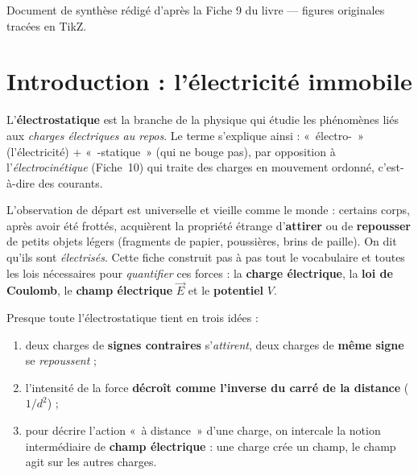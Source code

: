 \documentclass[11pt,a4paper]{article}
\newcommand{\vc}[1]{\vec{#1}}
\begin{document}
\vspace{0.5cm}
{\small\color{black!60} Document de synthèse rédigé d'après la Fiche 9 du livre — figures originales tracées en TikZ.}
\par
\endgroup

\newpage
\renewcommand{\contentsname}{\textcolor{primarydark}{Table des matières}}
\tableofcontents
\thispagestyle{fancy}
\newpage

\section{Introduction : l'électricité immobile}
L'\textbf{électrostatique} est la branche de la physique qui étudie les phénomènes liés aux
\emph{charges électriques au repos}. Le terme s'explique ainsi : «~électro-~» (l'électricité) +
«~-statique~» (qui ne bouge pas), par opposition à l'\emph{électrocinétique} (Fiche~10) qui traite
des charges en mouvement ordonné, c'est-à-dire des courants.

L'observation de départ est universelle et vieille comme le monde : certains corps, après avoir été
frottés, acquièrent la propriété étrange d'\textbf{attirer} ou de \textbf{repousser} de petits
objets légers (fragments de papier, poussières, brins de paille). On dit qu'ils sont
\emph{électrisés}. Cette fiche construit pas à pas tout le vocabulaire et toutes les lois nécessaires
pour \emph{quantifier} ces forces : la \textbf{charge électrique}, la \textbf{loi de Coulomb}, le
\textbf{champ électrique} $\vc{E}$ et le \textbf{potentiel} $V$.

\begin{remarque}
Presque toute l'électrostatique tient en trois idées :
\begin{enumerate}[leftmargin=1.8em,topsep=2pt,itemsep=1pt]
  \item deux charges de \textbf{signes contraires} s'\emph{attirent}, deux charges de \textbf{même
        signe} se \emph{repoussent} ;
  \item l'intensité de la force \textbf{décroît comme l'inverse du carré de la distance}
        ($1/d^2$) ;
  \item pour décrire l'action «~à distance~» d'une charge, on intercale la notion intermédiaire
        de \textbf{champ électrique} : une charge crée un champ, le champ agit sur les autres
        charges.
\end{enumerate}
\end{remarque}
\end{document}
